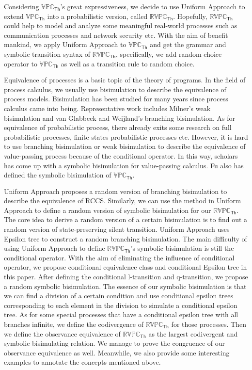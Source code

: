 \begin{digest}
  Considering $\mathbb{VPC}_{\mathsf{Th}}$’s great expressiveness, we decide to use Uniform Approach to extend $\mathbb{VPC}_{\mathsf{Th}}$ into a probabilistic version, called $\mathbb{RVPC}_{\mathsf{Th}}$. Hopefully, $\mathbb{RVPC}_{\mathsf{Th}}$ could help to model and analyze some meaningful real-world processes such as communication processes and network security etc. With the aim of benefit mankind, we apply Uniform Approach to $\mathbb{VPC}_{\mathsf{Th}}$ and get the grammar and symbolic transition syntax of $\mathbb{RVPC}_{\mathsf{Th}}$, specifically, we add random choice operator to $\mathbb{VPC}_{\mathsf{Th}}$ as well as a transition rule to random choice. 
  
  Equivalence of processes is a basic topic of the theory of programs. In the field of process calculus, we usually use bisimulation to describe the equivalence of process models. Bisimulation has been studied for many years since process calculus came into being. Representative work includes Milner’s weak bisimulation and van Glabbeek and Weijland’s branching bisimulation. As for equivalence of probabilistic process, there already exits some research on full probabilistic processes, finite states probabilistic processes etc. However, it is hard to use branching bisimulation or weak bisimulation to describe the equivalence of value-passing process because of the conditional operator. In this way, scholars has come up with a symbolic bisimulation for value-passing calculus. Fu also has defined the symbolic bisimulation of $\mathbb{VPC}_{\mathsf{Th}}$. 
  
  Uniform Approach proposes a random version of branching bisimulation to describe the equivalence of RCCS. Similarly, we can use the method in Uniform Approach to define a random version of symbolic bisimulation for our $\mathbb{RVPC}_{\mathsf{Th}}$. The core idea to derive a random version of a certain bisimulation is to find out a random version of state-preserving silent transition. Uniform Approach uses Epsilon tree to construct a random branching bisimulation. The main difficulty of using Uniform Approach to define $\mathbb{RVPC}_{\mathsf{Th}}$’s symbolic bisimulation is still the conditional operator. With the aim of eliminating the influence of conditional operator, we propose conditional equivalence class and conditional Epsilon tree in this paper. After defining the conditional l-transition and q-transition, we propose a random symbolic bisimulation. The essence of our symbolic bisimulation is that we can find a division of a certain condition and use conditional epsilon trees corresponding to each element in the division to simulate a conditional epsilon tree. As for some special processes that have a conditional epsilon tree with all branches infinite, we define the codivergence of $\mathbb{RVPC}_{\mathsf{Th}}$ for those processes. Then we define the observance equivalence of $\mathbb{RVPC}_{\mathsf{Th}}$ as the largest codivergent and symbolic bisimulating relation. We manage to prove the congruence of our observance equivalence as well. Meanwhile, we also provide some interesting examples to annotate the concepts mentioned above.
  

\end{digest}
